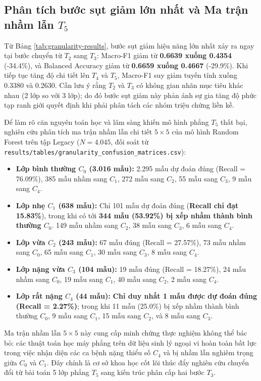 \subsection{Phân tích bước sụt giảm lớn nhất và Ma trận nhầm lẫn $T_5$}
Từ Bảng \ref{tab:granularity-results}, bước sụt giảm hiệu năng lớn nhất xảy ra ngay tại bước chuyển từ $T_2$ sang $T_3$: Macro-F1 giảm từ \textbf{0.6639 xuống 0.4354} (-34.4\%), và Balanced Accuracy giảm từ \textbf{0.6659 xuống 0.4667} (-29.9\%). Khi tiếp tục tăng độ chi tiết lên $T_4$ và $T_5$, Macro-F1 suy giảm tuyến tính xuống 0.3380 và 0.2630. Cần lưu ý rằng $T_2$ và $T_3$ có không gian nhãn mục tiêu khác nhau (2 lớp so với 3 lớp); do đó bước sụt giảm này phản ánh sự gia tăng độ phức tạp ranh giới quyết định khi phải phân tách các nhóm triệu chứng liền kề.

Để làm rõ căn nguyên toán học và lâm sàng khiến mô hình phẳng $T_5$ thất bại, nghiên cứu phân tích ma trận nhầm lẫn chi tiết $5 \times 5$ của mô hình Random Forest trên tập Legacy ($N = 4.045$, đối soát từ \texttt{results/tables/granularity\_confusion\_matrices.csv}):
\begin{itemize}
    \item \textbf{Lớp bình thường $C_0$ (3.016 mẫu):} 2.295 mẫu dự đoán đúng (Recall = 76.09\%), 385 mẫu nhầm sang $C_1$, 272 mẫu sang $C_2$, 55 mẫu sang $C_3$, 9 mẫu sang $C_4$.
    \item \textbf{Lớp nhẹ $C_1$ (638 mẫu):} Chỉ 101 mẫu dự đoán đúng (\textbf{Recall chỉ đạt 15.83\%}), trong khi có tới \textbf{344 mẫu (53.92\%) bị xếp nhầm thành bình thường $C_0$}. 149 mẫu nhầm sang $C_2$, 38 mẫu sang $C_3$, 6 mẫu sang $C_4$.
    \item \textbf{Lớp vừa $C_2$ (243 mẫu):} 67 mẫu đúng (Recall = 27.57\%), 73 mẫu nhầm sang $C_0$, 65 mẫu sang $C_1$, 30 mẫu sang $C_3$, 8 mẫu sang $C_4$.
    \item \textbf{Lớp nặng vừa $C_3$ (104 mẫu):} 19 mẫu đúng (Recall = 18.27\%), 24 mẫu nhầm sang $C_0$, 19 mẫu sang $C_1$, 40 mẫu sang $C_2$, 2 mẫu sang $C_4$.
    \item \textbf{Lớp rất nặng $C_4$ (44 mẫu):} \textbf{Chỉ duy nhất 1 mẫu được dự đoán đúng (Recall = 2.27\%)}; trong khi 11 mẫu (25.0\%) bị xếp nhầm thành bình thường $C_0$, 9 mẫu sang $C_1$, 15 mẫu sang $C_2$, và 8 mẫu sang $C_3$.
\end{itemize}

Ma trận nhầm lẫn $5 \times 5$ này cung cấp minh chứng thực nghiệm không thể bác bỏ: các thuật toán học máy phẳng trên dữ liệu sinh lý ngoại vi hoàn toàn bất lực trong việc nhận diện các ca bệnh nặng thiểu số $C_4$ và bị nhầm lẫn nghiêm trọng giữa $C_0$ và $C_1$. Đây chính là cơ sở khoa học cốt lõi thúc đẩy nghiên cứu chuyển đổi từ bài toán 5 lớp phẳng $T_5$ sang kiến trúc phân cấp hai bước $T_3$.

